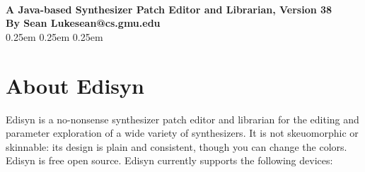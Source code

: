 \documentclass{article}
\begin{document}
\\[0.5em]
{\large \bf A Java-based Synthesizer Patch Editor and Librarian, Version 38\\[0.2em]
By Sean Luke\qquad sean@cs.gmu.edu}\\[0.2em]

\vspace{-1em}
\setcounter{tocdepth}{2}
\advance\cftsecnumwidth 0.25em\relax
\advance\cftsubsecindent 0.25em\relax
\advance\cftsubsecnumwidth 0.25em\relax
\tableofcontents

\clearpage

\section{About Edisyn}

Edisyn is a no-nonsense synthesizer patch editor and librarian for the editing and parameter exploration of a wide variety of synthesizers.  It is not skeuomorphic or skinnable: its design is plain and consistent, though you can change the colors.  Edisyn is free open source.  Edisyn currently supports the following devices: 
\end{document}
